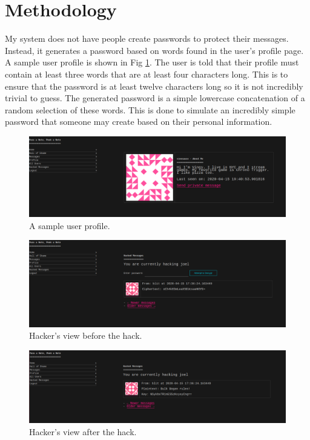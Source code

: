 \documentclass[conference]{csce}
\begin{document}
\section{Methodology}
My system does not have people create passwords to protect their messages. Instead, it generates a password based on words found in the user's profile page. A sample user profile is shown in Fig \ref{fig:profile}. The user is told that their profile must contain at least three words that are at least four characters long. This is to ensure that the password is at least twelve characters long so it is not incredibly trivial to guess. The generated password is a simple lowercase concatenation of a random selection of these words. This is done to simulate an incredibly simple password that someone may create based on their personal information. \\
\begin{figure}
    \centering
    \includegraphics[width=\columnwidth]{profile.png}
    \caption{A sample user profile.}
    \label{fig:profile}
\end{figure}
\begin{figure}
    \centering
    \includegraphics[width=\columnwidth]{before_hack.png}
    \caption{Hacker's view before the hack.}
    \label{fig:before}
\end{figure}
\begin{figure}
    \centering
    \includegraphics[width=\columnwidth]{after_hack.png}
    \caption{Hacker's view after the hack.}
    \label{fig:after}
\end{figure}
\end{document}
